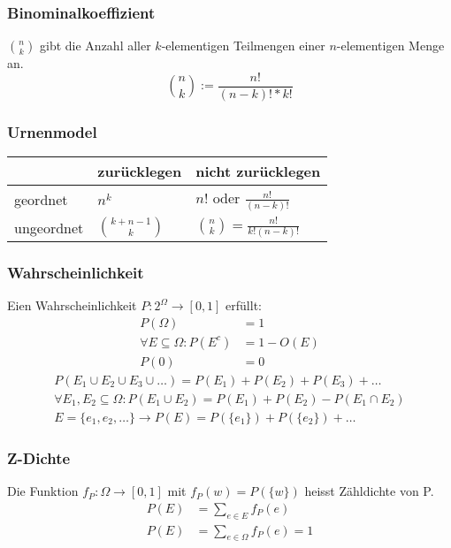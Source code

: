 \documentclass[landscape,twocolumn,a4paper]{article}
\begin{document}
\subsubsection*{Binominalkoeffizient}
$\binom{n}{k}$ gibt die Anzahl aller $k$-elementigen Teilmengen einer $n$-elementigen Menge an. \\
\begin{equation}
	 \binom{n}{k} := \frac{n!}{(n-k)!*k!}
\end{equation}

\subsubsection*{Urnenmodel}
\begin{center}
	\begin{tabular}{l|l|l}
		 					&	zur\"{u}cklegen			&	nicht zur\"{u}cklegen\\
		 \hline
		 geordnet		&	$n^k$							&	$n!$ oder $\frac{n!}{(n-k)!}$\\
		 \hline
		 ungeordnet	&	$\binom{k+n-1}{k}$	&	$\binom{n}{k}=\frac{n!}{k!(n-k)!}$
	\end{tabular}
\end{center}

\subsubsection*{Wahrscheinlichkeit}
Eien Wahrscheinlichkeit $P: 2^{\Omega} \rightarrow [0,1]$ erfüllt:
\begin{align}
	 P(\Omega) &= 1 \\
	 \forall E \subseteq \Omega : P(E^c) &=1-O(E)\\
	 P(0) &= 0
\end{align}
\begin{align}
	 P(E_1 \cup E_2 \cup E_3 \cup  \dots ) = P(E_1) + P(E_2) + P(E_3) + \dots \\	 
	 \forall E_1, E_2 \subseteq \Omega : P(E_1\cup E_2) = P(E_1) + P(E_2) - P(E_1 \cap E_2)\\
	 E=\{e_1,e_2, \dots \} \rightarrow P(E) = P(\{e_1\}) + P(\{e_2\}) + \dots
\end{align}

\subsubsection*{Z-Dichte}
Die Funktion $f_P : \Omega \rightarrow [0,1]$ mit $f_P(w)=P(\{w\})$ heisst Zähldichte von P.
\begin{align}
	 P(E) &=\sum_{e \in E} f_P(e) \\
	 P(E) &=\sum_{e \in \Omega} f_P(e)=1
\end{align}
\end{document}
